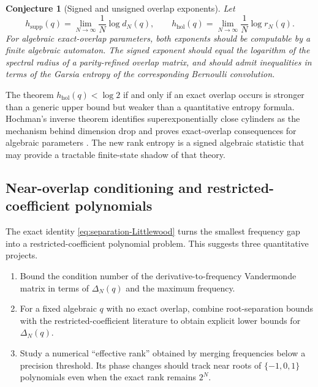 \documentclass[11pt]{article}
\numberwithin{equation}{section}
\newtheorem{conjecture}[theorem]{Conjecture}
\theoremstyle{definition}
\theoremstyle{remark}
\begin{document}
\begin{conjecture}[Signed and unsigned overlap exponents]
\label{conj:rank-vs-Garsia}
Let
\begin{equation}
 h_{\mathrm{supp}}(q)=\lim_{N\to\infty}\frac1N\log d_N(q),
 \qquad
 h_{\mathrm{hol}}(q)=\lim_{N\to\infty}\frac1N\log r_N(q).
 \label{eq:two-entropies}
\end{equation}
For algebraic exact-overlap parameters, both exponents should be computable by
a finite algebraic automaton.  The signed exponent should equal the logarithm
of the spectral radius of a parity-refined overlap matrix, and should admit
inequalities in terms of the Garsia entropy of the corresponding Bernoulli
convolution.
\end{conjecture}

The theorem $h_{\mathrm{hol}}(q)<\log2$ if and only if an exact overlap occurs
is stronger than a generic upper bound but weaker than a quantitative entropy
formula.  Hochman's inverse theorem identifies superexponentially close
cylinders as the mechanism behind dimension drop and proves exact-overlap
consequences for algebraic parameters \cite{Hochman}.  The new rank entropy is
a signed algebraic statistic that may provide a tractable finite-state shadow
of that theory.

\subsection{Near-overlap conditioning and restricted-coefficient polynomials}

The exact identity \eqref{eq:separation-Littlewood} turns the smallest frequency
gap into a restricted-coefficient polynomial problem.  This suggests three
quantitative projects.
\begin{enumerate}
 \item Bound the condition number of the derivative-to-frequency Vandermonde
       matrix in terms of $\Delta_N(q)$ and the maximum frequency.
 \item For a fixed algebraic $q$ with no exact overlap, combine root-separation
       bounds with the restricted-coefficient literature
       \cite{BorweinPinner,BorweinErdelyiKos} to obtain explicit lower bounds
       for $\Delta_N(q)$.
 \item Study a numerical ``effective rank'' obtained by merging frequencies
       below a precision threshold.  Its phase changes should track near roots
       of $\{-1,0,1\}$ polynomials even when the exact rank remains $2^N$.
\end{enumerate}
\end{document}
